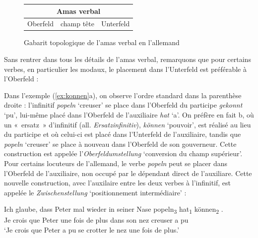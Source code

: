 {    \begin{figure}[H]
    \def\arraystretch{1.5}
    \setlength{\tabcolsep}{4ex}
    \begin{tabular}{|c|c|c|}
    \hline
    \multicolumn{3}{|c|}{\cellcolor{lsDOIGray}Amas verbal}\\
    \hline
    Oberfeld & \cellcolor{lsDOIGray}champ tête & Unterfeld\\
    \hline
    \end{tabular}
    \caption{Gabarit topologique de l'amas verbal en l'allemand\label{fig:topo-amas-allemand}}
    \end{figure}
    
    Sans rentrer dans tous les détails de l’amas verbal, remarquons que pour certains verbes, en particulier les modaux, le placement dans l’Unterfeld est préférable à l’Oberfeld :

    \ea\label{ex:konnen}
    \z
    \z
    Dans l’exemple (\ref{ex:konnen}a), on observe l’ordre standard dans la parenthèse droite : l’infinitif \textit{popeln} ‘creuser’ se place dans l’Oberfeld du participe \textit{gekonnt} ‘pu’, lui-même placé dans l’Oberfeld de l’auxiliaire \textit{hat} ‘a’. On préfère en fait b, où un «~ersatz~» d’infinitif (all. \textit{Ersatzinfinitiv}), \textit{können} ‘pouvoir’, est réalisé au lieu du participe et où celui-ci est placé dans l’Unterfeld de l’auxiliaire, tandis que \textit{popeln} ‘creuser’ se place à nouveau dans l’Oberfeld de son gouverneur. Cette construction est appelée l’\textit{Oberfeldumstellung} ‘conversion du champ supérieur’. Pour certains locuteurs de l’allemand, le verbe \textit{popeln} peut se placer dans l’Oberfeld de l’auxiliaire, non occupé par le dépendant direct de l’auxiliare. Cette nouvelle construction, avec l’auxilaire entre les deux verbes à l’infinitif, est appelée le \textit{Zwischenstellung} ‘positionnement intermédiaire’ :

    \begin{exe}
    \begin{xlist}
     \gll Ich glaube,  {\ob} dass Peter {mal wieder} in seiner Nase  {popeln\textsubscript{3}} {hat\textsubscript{1}} {können\textsubscript{2}} {\cb}.\\
    Je crois   {\ob} que   Peter {une fois de plus} dans son nez  creuser  a     pu {\cb}\\
    \glt ‘Je crois que Peter a pu se crotter le nez {une fois de plus}.’
    \end{xlist}
    \end{exe}
}
